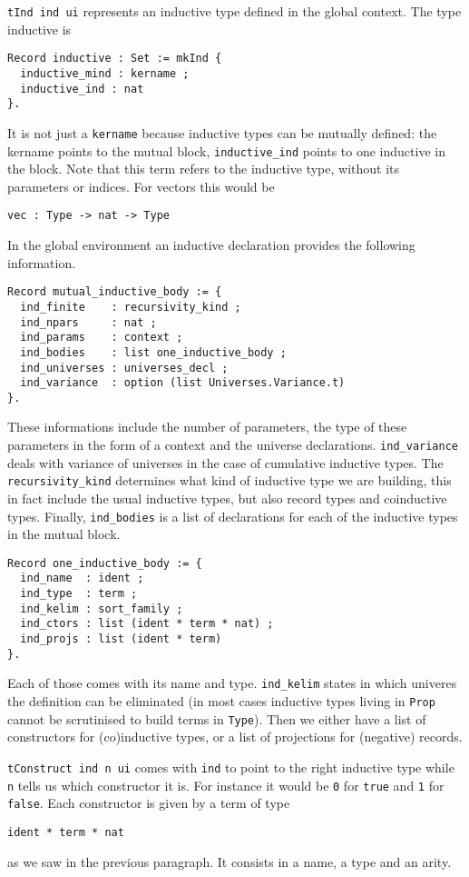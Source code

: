 \texttt{tInd ind ui} represents an inductive type defined in the global
context. The type inductive is
\begin{verbatim}
Record inductive : Set := mkInd {
  inductive_mind : kername ;
  inductive_ind : nat
}.
\end{verbatim}
It is not just a \texttt{kername} because inductive types can be
mutually defined: the kername points to the mutual block,
\texttt{inductive_ind} points to one inductive in the block.
Note that this term refers to the inductive type, without its parameters or
indices. For vectors this would be
\begin{verbatim}
vec : Type -> nat -> Type
\end{verbatim}
In the global environment an inductive declaration provides the following
information.
\begin{verbatim}
Record mutual_inductive_body := {
  ind_finite    : recursivity_kind ;
  ind_npars     : nat ;
  ind_params    : context ;
  ind_bodies    : list one_inductive_body ;
  ind_universes : universes_decl ;
  ind_variance  : option (list Universes.Variance.t)
}.
\end{verbatim}
These informations include the number of parameters, the type of these
parameters in the form of a context and the universe declarations.
\texttt{ind_variance} deals with variance of universes in the case
of cumulative inductive types.
The \texttt{recursivity_kind} determines what kind of inductive type
we are building, this in fact include the usual inductive types, but also
record types and coinductive types.
Finally, \texttt{ind_bodies} is a list of declarations for each of
the inductive types in the mutual block.
\begin{verbatim}
Record one_inductive_body := {
  ind_name  : ident ;
  ind_type  : term ;
  ind_kelim : sort_family ;
  ind_ctors : list (ident * term * nat) ;
  ind_projs : list (ident * term)
}.
\end{verbatim}
Each of those comes with its name and type.
\texttt{ind_kelim} states in which univeres the definition can be
eliminated (in most cases inductive types living in \texttt{Prop}
cannot be scrutinised to build terms in \texttt{Type}).
Then we either have a list of constructors for (co)inductive types, or a list
of projections for (negative) records.


\texttt{tConstruct ind n ui} comes with \texttt{ind} to point
to the right inductive type while \texttt{n} tells us which constructor
it is.
For instance it would be \texttt{0} for \texttt{true} and
\texttt{1} for \texttt{false}.
Each constructor is given by a term of type
\begin{verbatim}
ident * term * nat
\end{verbatim}
as we saw in the previous paragraph. It consists in a name, a type and an arity.

